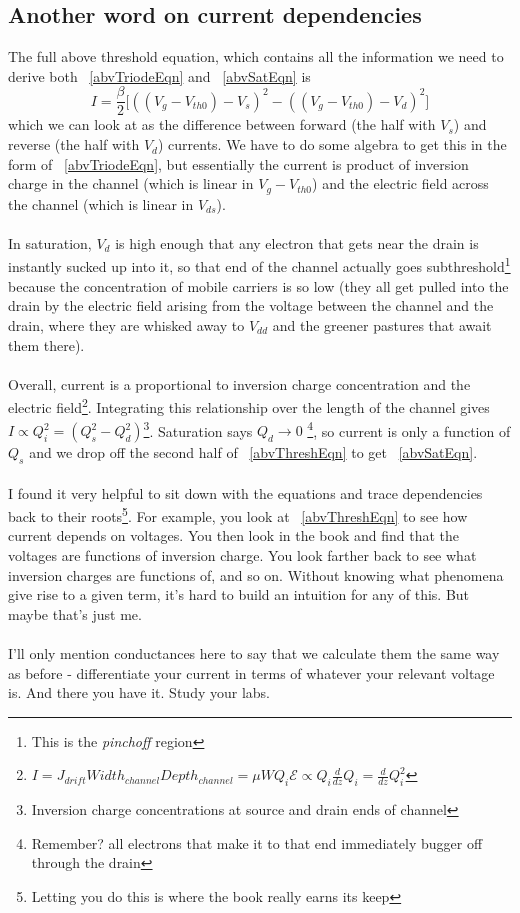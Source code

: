 \documentclass[main]{subfiles}
\begin{document}
\subsection{Another word on current dependencies}
The full above threshold equation, which contains all the information we need to derive both ~\eqref{abvTriodeEqn} and ~\eqref{abvSatEqn} is
\begin{equation}
I = \frac{\beta}{2}\big[((V_g - V_{th0}) - V_s)^2 - ((V_g - V_{th0}) - V_d)^2\big] \label{abvThreshEqn}
\end{equation}
which we can look at as the difference between forward (the half with $V_s$) and reverse (the half with $V_d$) currents. We have to do some algebra to get this in the form of ~\eqref{abvTriodeEqn}, but essentially the current is product of inversion charge in the channel (which is linear in $V_g - V_{th0}$) and the electric field across the channel (which is linear in $V_{ds}$).\\ \\
In saturation, $V_d$ is high enough that any electron that gets near the drain is instantly sucked up into it, so that end of the channel actually goes subthreshold\footnote{This is the \textsl{pinchoff} region} because the concentration of mobile carriers is so low (they all get pulled into the drain by the electric field arising from the voltage between the channel and the drain, where they are whisked away to $V_{dd}$ and the greener pastures that await them there).\\ \\
Overall, current is a proportional to inversion charge concentration  and the electric field\footnote{$I = J_{drift}Width_{channel}Depth_{channel} = \mu W Q_i \mathcal{E} \propto Q_i \frac{d}{dz}Q_i = \frac{d}{dz}Q_i^2$}. Integrating this relationship over the length of the channel gives $I \propto Q_i^2 = (Q_s^2 - Q_d^2)$\footnote{Inversion charge concentrations at source and drain ends of channel}. Saturation says $Q_d \to 0$ \footnote{Remember? all electrons that make it to that end immediately bugger off through the drain}, so current is only a function of $Q_s$ and we drop off the second half of ~\eqref{abvThreshEqn} to get ~\eqref{abvSatEqn}. \\ \\
I found it very helpful to sit down with the equations and trace dependencies back to their roots\footnote{Letting you do this is where the book really earns its keep}. For example, you look at ~\eqref{abvThreshEqn} to see how current depends on voltages. You then look in the book and find that the voltages are functions of inversion charge. You look farther back to see what inversion charges are functions of, and so on. Without knowing what phenomena give rise to a given term, it's hard to build an intuition for any of this. But maybe that's just me.\\ \\
I'll only mention conductances here to say that we calculate them the same way as before - differentiate your current in terms of whatever your relevant voltage is. And there you have it. Study your labs.
\end{document}
